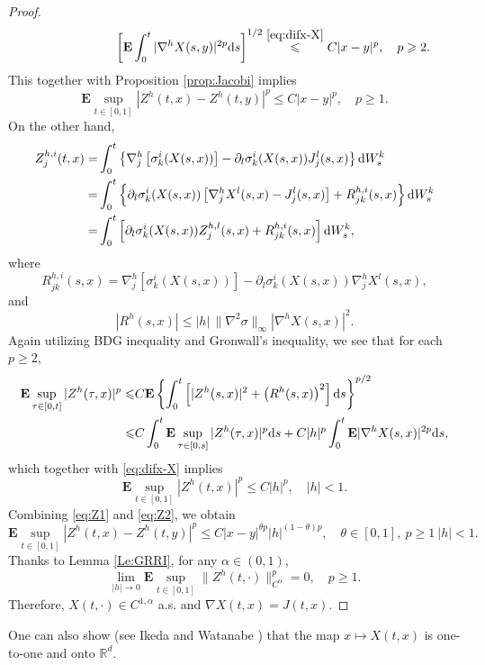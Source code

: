 \documentclass[twoside, 12pt]{book}
\numberwithin{equation}{chapter}
\def\mR{{\mathbb R}}
\def\bE{{\mathbf E}}
\def\geq{\geqslant}
\def\leq{\leqslant}
\def\d{\text{\rm{d}}}
\begin{document}
\begin{proof}
\[\begin{aligned}
       &\qquad\qquad\qquad\quad \left[ \bE\int_0^t|\nabla^{h}X(s,y)|^{2p} \d s \right]^{1/2} \overset{\eqref{eq:difx-X}}{\leq} C |x-y|^p, \quad p\geq 2. 
   \end{aligned}
   \]
   This together with Proposition \ref{prop:Jacobi} implies 
   \begin{equation}\label{eq:Z1}
       \bE\sup_{t\in[0,1]}|Z^h(t,x)-Z^h(t,y)|^p\leq C |x-y|^p, \quad p\geq 1. 
   \end{equation}
    On the other hand, 
    \begin{equation*}
    \begin{aligned}
        Z^{h,i}_j(t,x)=&\int_0^t \left\{ \nabla^{h}_j\left[\sigma^i_k(X(s,x))\right]-\partial_l \sigma^i_k(X(s,x))J^l_j(s,x)\right\} \d W^k_s\\
        =& \int_0^t \left\{\partial_l \sigma^i_k(X(s,x)) \left[\nabla^{h}_j X^l(s,x)-J^l_j(s,x)\right]+R^{h,i}_{jk}(s,x) \right\} \d W^k_s\\
       =&\int_0^t \left[\partial_l \sigma^i_k(X(s,x)) Z^{h,l}_j(s,x)+R^{h,i}_{jk}(s,x) \right] \d W^k_s, 
    \end{aligned}    
    \end{equation*}
    where 
    \[
        R^{h,i}_{jk}(s,x)= \nabla^{h}_j\left[\sigma^i_k(X(s,x))\right]-\partial_l \sigma^i_k(X(s,x)) \nabla^{h}_j X^l(s,x), 
    \]
    and 
    \[
         |R^h(s,x)|\leq |h|\,\|\nabla^2\sigma\|_\infty |\nabla^{h}X(s,x)|^2. 
    \]
    Again utilizing BDG inequality and Gronwall's inequality, we see that for each $p\geq 2$, 
    \begin{equation*}
    \begin{aligned}
        \bE \sup_{\tau\in [0,t]}|Z^h(\tau,x)|^p \leq& C \bE \left\{ \int_0^t \left[|Z^h(s,x)|^2+\left(R^h(s,x)\right)^2\right] \d s \right\}^{p/2}\\
        \leq&C \int_0^t \bE \sup_{\tau\in [0,s]}|Z^h(\tau,x)|^p \d s + C |h|^p \int_0^t\bE |\nabla^{h}X(s,x)|^{2p} \d s,
    \end{aligned}     
    \end{equation*}
    which together with \eqref{eq:difx-X} implies 
    \begin{equation}\label{eq:Z2}
        \bE \sup_{t\in [0,1]}|Z^h(t,x)|^p \leq C |h|^p, \quad |h|<1. 
    \end{equation}
    Combining \eqref{eq:Z1} and \eqref{eq:Z2}, we obtain 
    \begin{equation*}
        \bE\sup_{t\in[0,1]}|Z^h(t,x)-Z^h(t,y)|^p\leq C |x-y|^{\theta p}|h|^{(1-\theta)p}, \quad \theta\in [0,1], ~ p\geq 1~|h|<1. 
    \end{equation*}
    Thanks to Lemma \eqref{Le:GRRI}, for any $\alpha\in (0,1)$, 
    \begin{equation*}
        \lim_{|h|\to 0}\bE \sup_{t\in[0,1]}\|Z^h(t,\cdot)\|_{C^{\alpha}}^p=0, \quad p\geq 1. 
    \end{equation*}
    Therefore, $X(t,\cdot)\in C^{1,\alpha}$ a.s. and $\nabla X(t,x)=J(t,x)$. 
    \end{proof}
    One can also show (see Ikeda and Watanabe \cite{ikeda2014stochastic}) that the map $x\mapsto X(t,x)$ is one-to-one and onto $\mR^d$. 
\end{document}
